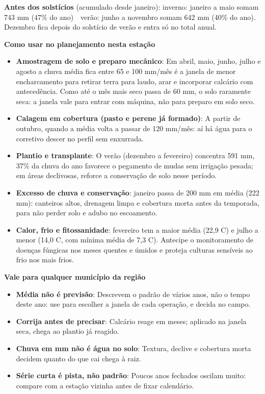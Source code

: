 \documentclass[10pt,a4paper]{article}
\begin{document}
\vspace{1pt}
{\footnotesize\textbf{Antes dos solstícios} (acumulado desde janeiro):
inverno: janeiro a maio somam 743 mm (47\% do ano) \,\textbullet\, verão: junho a novembro somam 642 mm (40\% do ano). Dezembro fica depois do solstício de verão e entra só no total
anual.}

\vspace{2pt}
{\bfseries\small Como usar no planejamento nesta estação}

\footnotesize\begin{itemize}\setlength{\itemsep}{0.5pt}
  \item \textbf{Amostragem de solo e preparo mecânico}: Em abril, maio, junho, julho e agosto a chuva média fica entre 65 e 100 mm/mês \textemdash{} é a janela de menor encharcamento para retirar terra para laudo, arar e incorporar calcário com antecedência. Como até o mês mais seco passa de 60 mm, o solo raramente seca: a janela vale para entrar com máquina, não para preparo em solo seco.
  \item \textbf{Calagem em cobertura (pasto e perene já formado)}: A partir de outubro, quando a média volta a passar de 120 mm/mês: aí há água para o corretivo descer no perfil sem enxurrada.
  \item \textbf{Plantio e transplante}: O verão (dezembro a fevereiro) concentra 591 mm, 37\% da chuva do ano \textemdash{} favorece o pegamento de mudas sem irrigação pesada; em áreas declivosas, reforce a conservação de solo nesse período.
  \item \textbf{Excesso de chuva e conservação}: janeiro passa de 200 mm em média (222 mm): canteiros altos, drenagem limpa e cobertura morta antes da temporada, para não perder solo e adubo no escoamento.
  \item \textbf{Calor, frio e fitossanidade}: fevereiro tem a maior média (22,9 \textdegree{}C) e julho a menor (14,0 \textdegree{}C, com mínima média de 7,3 \textdegree{}C). Antecipe o monitoramento de doenças fúngicas nos meses quentes e úmidos e proteja culturas sensíveis ao frio nos mais frios.
\end{itemize}

\vspace{1pt}
{\bfseries\small Vale para qualquer município da região}

\scriptsize\begin{itemize}\setlength{\itemsep}{0.5pt}
  \item \textbf{Média não é previsão}: Descrevem o padrão de vários anos, não o tempo deste ano: use para escolher a janela de cada operação, e decida no campo.
  \item \textbf{Corrija antes de precisar}: Calcário reage em meses; aplicado na janela seca, chega ao plantio já reagido.
  \item \textbf{Chuva em mm não é água no solo}: Textura, declive e cobertura morta decidem quanto do que cai chega à raiz.
  \item \textbf{Série curta é pista, não padrão}: Poucos anos fechados oscilam muito: compare com a estação vizinha antes de fixar calendário.
\end{itemize}
\end{document}
